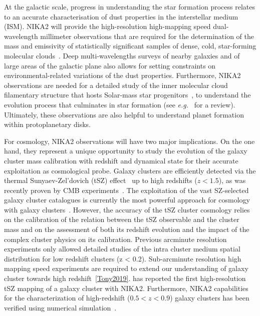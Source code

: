 At the galactic scale, progress in understanding the star formation
process relates to an accurate characterisation of dust properties in
the interstellar medium (ISM). NIKA2 will provide the high-resolution
high-mapping speed dual-wavelength millimeter observations that are
required for the determination of the mass and emissivity of
statistically significant samples of dense, cold, star-forming
molecular clouds~\citep{Rigby2018}.
Deep multi-wavelengths surveys of nearby galaxies and of large areas
of the galactic plane also allows for setting constraints on
environmental-related variations of the dust properties.
Furthermore, NIKA2 observations are needed for a
detailed study of the inner molecular cloud filamentary structure that
hosts Solar-mass star progenitors~\citep{Bracco2017}, to
understand the evolution process that culminates in star
formation (see \emph{e.g.}~\citet{Andre2014} for a review). Ultimately, these
observations are also helpful to understand planet formation within
protoplanetary disks.

For cosmology, NIKA2 observations will have two major
implications. On the one hand, they represent a unique opportunity to
study the evolution of the galaxy cluster mass calibration with
redshift and {\lp dynamical state} for their accurate exploitation as cosmological probe. 
Galaxy clusters are efficiently detected via the thermal
Sunyaev-Zel'dovich (tSZ) effect~\citep{SZ1970} up to high redshifts {\lp ($z<1.5$)}, as was recently
proven by CMB
experiments~\citep{Hasselfield2013_ACT_SZ, Reichardt2013_SPT_SZ, Planck2016_SZcat}.
The exploitation of the vast SZ-selected galaxy cluster catalogues is
currently the most powerful approach for cosmology with galaxy
clusters~\citep{Planck_2016_SZ_cosmo}. However, the accuracy of the tSZ cluster
cosmology relies on the calibration of the relation between the tSZ
observable and the cluster mass and on the assessment of both its redshift
evolution and the impact of the complex cluster physics on its calibration. 
Previous arcminute resolution experiments only allowed detailed studies
of the intra cluster medium spatial distribution for low redshift clusters (z <
0.2). Sub-arcminute resolution high mapping speed experiments are
required to extend our understanding of galaxy cluster towards high
redshift~\ref{Tony2019}. \citet{Ruppin2018} has reported the first high-resolution
tSZ mapping of a galaxy cluster with NIKA2. Furthermore, NIKA2
capabilities for the characterization of high-redshift {\lp ($0.5<z<0.9$)} galaxy clusters
has been verified using numerical simulation~\citep{Ruppin2019}.


